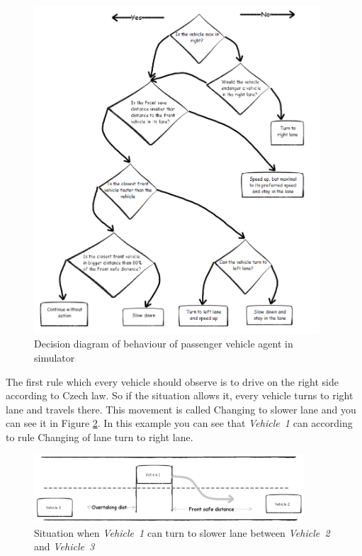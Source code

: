\begin{figure}[ph]
\centering
\includegraphics[width=0.95\textwidth,height=0.95\textheight,keepaspectratio]{figures/Chapter_4/4_diagram.png}
\centering
\protect\caption{\label{fig:4_2_3_3-4}Decision diagram of behaviour of passenger vehicle agent in simulator}
\end{figure}

The first rule which every vehicle should observe is to drive on the right side according to Czech law. So if the situation allows it, every vehicle turns to right lane and travels there. This movement is called Changing to slower lane and you can see it in Figure \ref{fig:4_2_3_3-5}. In this example you can see that \textit{\mbox{Vehicle 1}} can according to rule Changing of lane turn to right lane.

\begin{figure}[ph]
\centering
\includegraphics[width=0.90\textwidth,height=0.90\textheight,keepaspectratio]{figures/Chapter_4/4_changing_slower_lane.png}
\centering
\protect\caption{\label{fig:4_2_3_3-5}Situation when \textit{\mbox{Vehicle 1}} can turn to slower lane between \textit{\mbox{Vehicle 2}} and \textit{\mbox{Vehicle 3}}}
\end{figure}


